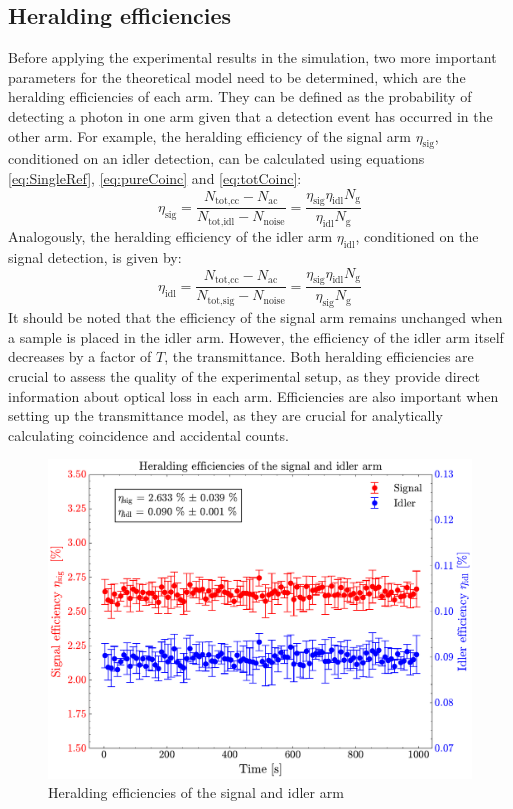 \subsection{Heralding efficiencies}
Before applying the experimental results in the simulation, two more important parameters for the theoretical model need to be determined, which are the heralding efficiencies of each arm.\newline
They can be defined as the probability of detecting a photon in one arm given that a detection event has occurred in the other arm. For example, the heralding efficiency of the signal arm $\eta_{\text{sig}}$, conditioned on an idler detection, can be calculated using equations \ref{eq:SingleRef}, \ref{eq:pureCoinc} and \ref{eq:totCoinc}:
\begin{equation}
	\eta_{\text{sig}} = \frac{N_{\text{tot,cc}}-N_{\text{ac}}}{N_{\text{tot,idl}}-N_{\text{noise}}} = \frac{\eta_{\text{sig}}\eta_{\text{idl}}N_{\text{g}}}{\eta_{\text{idl}}N_{\text{g}}}
	\label{eq:EffSig}
\end{equation}
Analogously, the heralding efficiency of the idler arm $\eta_{\text{idl}}$, conditioned on the signal detection, is given by:
\begin{equation}
	\eta_{\text{idl}} = \frac{N_{\text{tot,cc}}-N_{\text{ac}}}{N_{\text{tot,sig}}-N_{\text{noise}}} = \frac{\eta_{\text{sig}}\eta_{\text{idl}}N_{\text{g}}}{\eta_{\text{sig}}N_{\text{g}}}
	\label{eq:EffIdl}
\end{equation}
It should be noted that the efficiency of the signal arm remains unchanged when a sample is placed in the idler arm. However, the efficiency of the idler arm itself decreases by a factor of $T$, the transmittance.\newline
Both heralding efficiencies are crucial to assess the quality of the experimental setup, as they provide direct information about optical loss in each arm. Efficiencies are also important when setting up the transmittance model, as they are crucial for analytically calculating coincidence and accidental counts.
\begin{figure}[tb!]
	\centering
	\includegraphics[width=.7\textwidth]{Images/HeraldingEff.pdf}
	\caption{Heralding efficiencies of the signal and idler arm}
	\label{fig:HeralEff}
\end{figure} \newline

